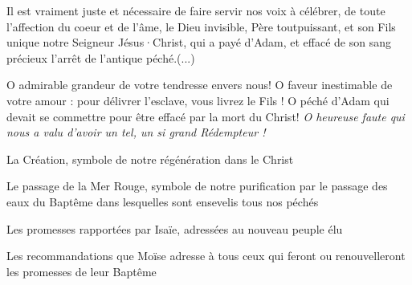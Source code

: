 \documentclass[%
fontsize=10%
,a5paper%
,DIV=15%
]{scrartcl}
\begin{document}

Il est vraiment juste et nécessaire
de faire servir nos voix à célébrer,
de toute l'affection du coeur et de
l'âme, le Dieu invisible, Père toutpuissant,
et son Fils unique notre Seigneur Jésus·Christ, qui a payé d'Adam, et effacé de son sang précieux l'arrêt de l'antique péché.(...)

O admirable grandeur de votre tendresse envers nous! O faveur inestimable de votre
amour : pour délivrer l'esclave, vous livrez le Fils !
O péché d'Adam qui devait se commettre pour être effacé par la mort du Christ!
\emph{O heureuse faute qui nous a valu d'avoir un tel, un si grand Rédempteur !}



\begin{item}
\item{La Création, symbole de notre régénération dans le Christ}
\item{Le passage de la Mer Rouge, symbole de notre purification par le passage des eaux du Baptême dans lesquelles sont ensevelis tous nos péchés}
\item{Les promesses rapportées par Isaïe, adressées au nouveau peuple élu}
\item{Les recommandations que Moïse adresse à tous ceux qui feront ou renouvelleront les promesses de leur Baptême}
\end{item}


\end{document}
